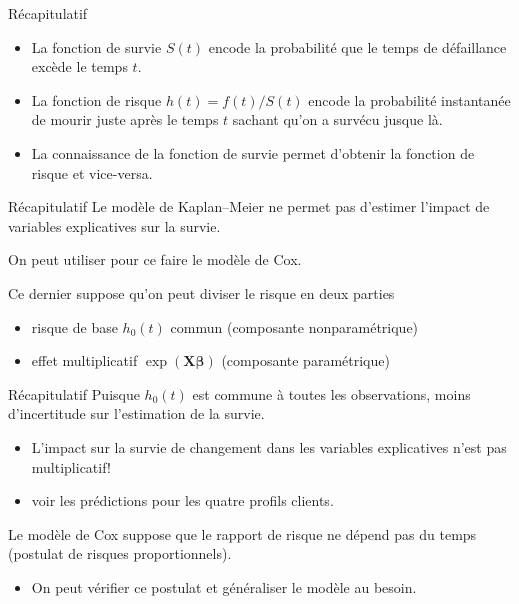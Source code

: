 \documentclass[
  ignorenonframetext,
]{beamer}
\providecommand{\tightlist}{%
  \setlength{\itemsep}{0pt}\setlength{\parskip}{0pt}}
\begin{document}
\begin{frame}{Récapitulatif}
\protect{}\label{ruxe9capitulatif-4}
\begin{itemize}
\tightlist
\item
  La fonction de survie \(S(t)\) encode la probabilité que le temps de
  défaillance excède le temps \(t\).
\item
  La fonction de risque \(h(t) = f(t)/S(t)\) encode la probabilité
  instantanée de mourir juste après le temps \(t\) sachant qu'on a
  survécu jusque là.
\item
  La connaissance de la fonction de survie permet d'obtenir la fonction
  de risque et vice-versa.
\end{itemize}
\end{frame}

\begin{frame}{Récapitulatif}
\protect{}\label{ruxe9capitulatif-5}
Le modèle de Kaplan--Meier ne permet pas d'estimer l'impact de variables
explicatives sur la survie.

On peut utiliser pour ce faire le modèle de Cox.

Ce dernier suppose qu'on peut diviser le risque en deux parties

\begin{itemize}
\tightlist
\item
  risque de base \(h_0(t)\) commun (composante nonparamétrique)
\item
  effet multiplicatif \(\exp(\mathbf{X}\boldsymbol{\beta})\) (composante
  paramétrique)
\end{itemize}
\end{frame}

\begin{frame}{Récapitulatif}
\protect{}\label{ruxe9capitulatif-6}
Puisque \(h_0(t)\) est commune à toutes les observations, moins
d'incertitude sur l'estimation de la survie.

\begin{itemize}
\tightlist
\item
  L'impact sur la survie de changement dans les variables explicatives
  n'est pas multiplicatif!
\item
  voir les prédictions pour les quatre profils clients.
\end{itemize}

Le modèle de Cox suppose que le rapport de risque ne dépend pas du temps
(postulat de risques proportionnels).

\begin{itemize}
\tightlist
\item
  On peut vérifier ce postulat et généraliser le modèle au besoin.
\end{itemize}
\end{frame}
\end{document}
